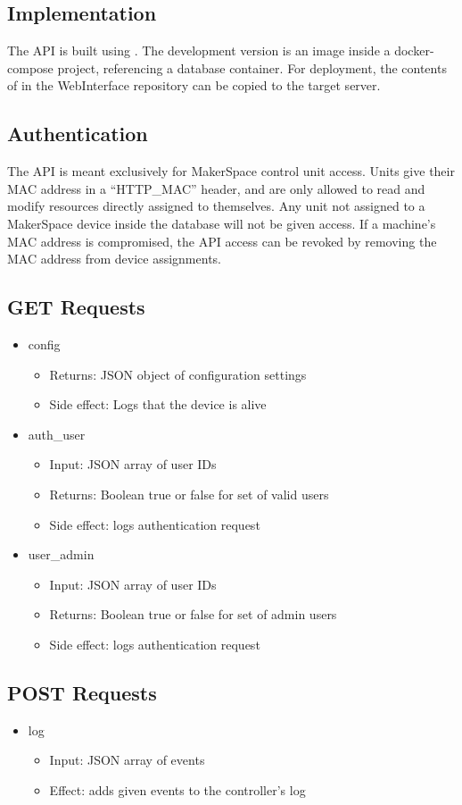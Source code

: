 \subsection{Implementation}
The API is built using .
The development version is an image inside a docker-compose project,
    referencing a database container.
For deployment, the contents of  in the WebInterface repository can be copied to the target server.

\subsection{Authentication}
The API is meant exclusively for MakerSpace control unit access.
Units give their MAC address in a ``HTTP\_MAC'' header,
    and are only allowed to read and modify resources directly assigned to themselves.
Any unit not assigned to a MakerSpace device inside the database will not be given access.
If a machine's MAC address is compromised,
    the API access can be revoked by removing the MAC address from device assignments.

\subsection{GET Requests}
\begin{itemize}
    \item config
    \begin{itemize}
        \item Returns: JSON object of configuration settings
        \item Side effect: Logs that the device is alive
    \end{itemize}
\end{itemize}
\begin{itemize}
    \item auth\_user
    \begin{itemize}
        \item Input: JSON array of user IDs
        \item Returns: Boolean true or false for set of valid users
        \item Side effect: logs authentication request
    \end{itemize}
\end{itemize}
\begin{itemize}
    \item user\_admin
    \begin{itemize}
        \item Input: JSON array of user IDs
        \item Returns: Boolean true or false for set of admin users
        \item Side effect: logs authentication request
    \end{itemize}
\end{itemize}

\subsection{POST Requests}
\begin{itemize}
    \item log
    \begin{itemize}
        \item Input: JSON array of events
        \item Effect: adds given events to the controller's log
    \end{itemize}
\end{itemize}